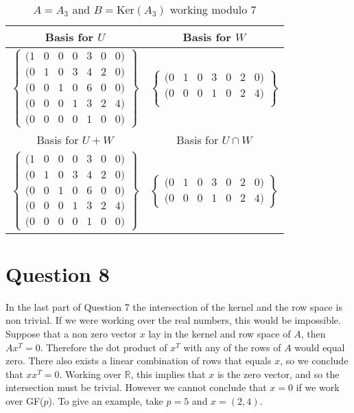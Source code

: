 \documentclass[10pt,a4paper,notitlepage]{article}
\newcommand{\R}{\mathbb{R}}
\newcommand{\Ker}{\text{Ker}}
\begin{document}
\begin{table}[H]
\centering
\begin{tabular}{|c|c|}
\hline
Basis for $U$ & Basis for $W$ \\
\hline
$\left\lbrace\begin{array}{ccccccc}
(1	& 0	& 0	& 0	& 3	& 0	& 0)\\
(0 & 1	& 0	& 3	& 4	& 2	& 0)\\
(0	& 0	& 1	& 0	& 6	& 0	& 0)\\
(0	& 0	& 0	& 1	& 3	& 2	& 4)\\
(0 & 0	& 0	& 0	& 1	& 0	& 0)
\end{array}
\right\rbrace$ & $\left\lbrace\begin{array}{ccccccc}
(0	& 1	& 0	& 3	& 0	& 2	& 0)\\
(0	& 0	& 0	& 1	& 0	& 2	& 4)\\
\end{array}
\right\rbrace$ \\
\hline Basis for $U+W$ & Basis for $U\cap W$\\
\hline $\left\lbrace\begin{array}{ccccccc}
(1	& 0	& 0	& 0	& 3	& 0	& 0)\\
(0	& 1	& 0	& 3	& 4	& 2	& 0)\\
(0	& 0	& 1	& 0	& 6	& 0	& 0)\\
(0	& 0	& 0	& 1	& 3	& 2	& 4)\\
(0	& 0	& 0	& 0	& 1	& 0	& 0)
\end{array}
\right\rbrace$ & $\left\lbrace\begin{array}{ccccccc}
(0	& 1	& 0	& 3	& 0	& 2	& 0)\\
(0	& 0	& 0	& 1	& 0	& 2	& 4)
\end{array}
\right\rbrace$ \\
\hline
\end{tabular}
\caption{$A=A_{3}$ and $B=\Ker(A_{3})$ working modulo 7}
\label{Q7.2}
\end{table}

\section*{\centering \large Question 8}
In the last part of Question 7 the intersection of the kernel and the row space is non trivial.  If we were working over the real numbers, this would be impossible. Suppose that a non zero vector $x$ lay in the kernel and row space of $A$, then $Ax^{T}=0$. Therefore the dot product of $x^{T}$ with any of the rows of $A$ would equal zero. There also exists a linear combination of rows that equals $x$, so we conclude that $xx^{T}=0$. Working over $\R$, this implies that $x$ is the zero vector, and so the intersection must be trivial. However we cannot conclude that $x=0$ if we work over GF($p$). To give an example, take $p=5$ and $x=(2,4)$.
\pagebreak
\end{document}
